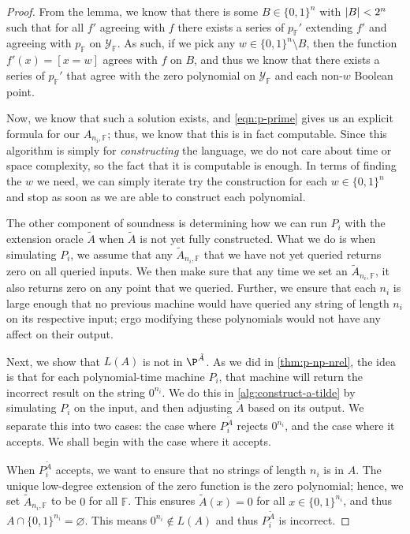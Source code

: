 \documentclass[english]{reedthesis}
\theoremstyle{plain}
\theoremstyle{definition}
\theoremstyle{remark}
\DeclarePairedDelimiter{\abs}{\lvert}{\rvert}
\begin{document}
\begin{proof}
  From the lemma, we know that there is some $B \in \{0, 1\}^{n}$ with
  $\abs{B} < 2^{n}$ such that for all $f'$ agreeing with $f$ there exists a
  series of $p_{\mathbb{F}}'$ extending $f'$ and agreeing with $p_{\mathbb{F}}$
  on $\mathcal{Y}_{\mathbb{F}}$. As such, if we pick any $w \in \{0, 1\}^{n} \setminus B$, then the
  function $f'(x) = [x = w]$ agrees with $f$ on $B$, and thus we know that there
  exists a series of $p_{\mathbb{F}}'$ that agree with the zero polynomial on
  $\mathcal{Y}_{\mathbb{F}}$ and each non-$w$ Boolean point.

  Now, we know that such a solution exists, and \cref{eqn:p-prime} gives us an
  explicit formula for our $A_{n_{i},\mathbb{F}}$; thus, we know that this is in
  fact computable. Since this algorithm is simply for \emph{constructing} the
  language, we do not care about time or space complexity, so the fact that it
  is computable is enough. In terms of finding the $w$ we need, we can simply
  iterate try the construction for each $w \in \{0, 1\}^{n}$ and stop as soon as
  we are able to construct each polynomial.

  The other component of soundness is determining how we can run $P_{i}$ with
  the extension oracle $\tilde{A}$ when $\tilde{A}$ is not yet fully
  constructed. What we do is when simulating $P_{i}$, we assume that any
  $\tilde{A}_{n_{i},\mathbb{F}}$ that we have not yet queried returns zero on
  all queried inputs. We then make sure that any time we set an
  $\tilde{A}_{n_{i},\mathbb{F}}$, it also returns zero on any point that we
  queried. Further, we ensure that each $n_{i}$ is large enough that no previous
  machine would have queried any string of length $n_{i}$ on its respective
  input; ergo modifying these polynomials would not have any affect on their
  output.

  Next, we show that $L(A)$ is not in $\P^{\tilde{A}}$. As we did in
  \cref{thm:p-np-nrel}, the idea is that for each polynomial-time machine
  $P_{i}$, that machine will return the incorrect result on the string
  $0^{n_{i}}$. We do this in \cref{alg:construct-a-tilde} by simulating $P_{i}$
  on the input, and then adjusting $\tilde{A}$ based on its output. We separate
  this into two cases: the case where $P_{i}^{\tilde{A}}$ rejects $0^{n_{i}}$,
  and the case where it accepts. We shall begin with the case where it accepts.

  When $P_{i}^{\tilde{A}}$ accepts, we want to ensure that no strings of length
  $n_{i}$ is in $A$. The unique low-degree extension of the zero function is the
  zero polynomial; hence, we set $\tilde{A}_{n_{i},\mathbb{F}}$ to be $0$ for
  all $\mathbb{F}$. This ensures $\tilde{A}(x) = 0$ for all
  $x \in \{0, 1\}^{n_{i}}$, and thus $A \cap \{0, 1\}^{n_{i}} = \varnothing$. This
  means $0^{n_{i}} \notin L(A)$ and thus $P_{i}^{\tilde{A}}$ is incorrect.


\end{proof}
\end{document}
